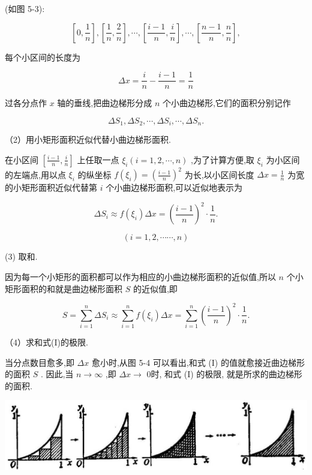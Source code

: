 \documentclass[lang=cn,newtx,10pt,scheme=chinese]{elegantbook}
\begin{document}
(如图 5-3):

\[
\left\lbrack {0,\frac{1}{n}}\right\rbrack ,\left\lbrack {\frac{1}{n},\frac{2}{n}}\right\rbrack ,\cdots ,\left\lbrack {\frac{i - 1}{n},\frac{i}{n}}\right\rbrack ,\cdots ,\left\lbrack {\frac{n - 1}{n},\frac{n}{n}}\right\rbrack ,
\]

每个小区间的长度为

\[
{\Delta x} = \frac{i}{n} - \frac{i - 1}{n} = \frac{1}{n}
\]

过各分点作 \(x\) 轴的垂线,把曲边梯形分成 \(n\) 个小曲边梯形,它们的面积分别记作

\[
\Delta {S}_{1},\Delta {S}_{2},\cdots ,\Delta {S}_{i},\cdots ,\Delta {S}_{n}.
\]

（2）用小矩形面积近似代替小曲边梯形面积.

在小区间 \(\left\lbrack {\frac{i - 1}{n},\frac{i}{n}}\right\rbrack\) 上任取一点 \({\xi }_{i}\left( {i = 1,2,\cdots ,n}\right)\) ,为了计算方便,取 \({\xi }_{i}\) 为小区间的左端点,用以点 \({\xi }_{i}\) 的纵坐标 \(f\left( {\xi }_{i}\right) = {\left( \frac{i - 1}{n}\right) }^{2}\) 为长,以小区间长度 \({\Delta x} = \frac{1}{n}\) 为宽的小矩形面积近似代替第 \(i\) 个小曲边梯形面积,可以近似地表示为

\[
\Delta {S}_{i} \approx f\left( {\xi }_{i}\right) {\Delta x} = {\left( \frac{i - 1}{n}\right) }^{2} \cdot \frac{1}{n}.
\]

\[
\left( {i = 1,2,\cdots \cdots ,n}\right)
\]

(3) 取和.

因为每一个小矩形的面积都可以作为相应的小曲边梯形面积的近似值,所以 \(n\) 个小矩形面积的和就是曲边梯形面积 \(S\) 的近似值,即

\[
S = \mathop{\sum }\limits_{{i = 1}}^{n}\Delta {S}_{i} \approx \mathop{\sum }\limits_{{i = 1}}^{n}f\left( {\xi }_{i}\right) {\Delta x} = \mathop{\sum }\limits_{{i = 1}}^{n}{\left( \frac{i - 1}{n}\right) }^{2} \cdot \frac{1}{n}. \tag{I}
\]

（4）求和式(I)的极限.

当分点数目愈多,即 \({\Delta x}\) 愈小时,从图 5-4 可以看出,和式 (I) 的值就愈接近曲边梯形的面积 \(S\) . 因此,当 \(n \rightarrow \infty\) ,即 \({\Delta x} \rightarrow\) 0时, 和式 (I) 的极限, 就是所求的曲边梯形的面积.

\begin{center}
\includegraphics[max width=1.0\textwidth]{images/01912c18-5c3f-733d-b775-749ba9897a9d_218_835855.jpg}
\end{center}
\end{document}
